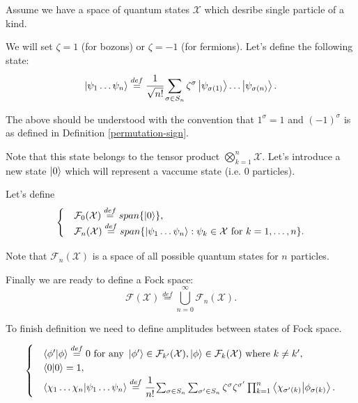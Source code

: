 \documentclass[main.tex]{subfiles}
\begin{document}
Assume we have a space of quantum states $\mathcal{X}$ which desribe single particle of a kind.

We will set $\zeta = 1$ (for bozons) or $\zeta = -1$ (for fermions). Let's define the following state:
\begin{equation}
\ket{\psi_1 \dots \psi_n} \stackrel{def}{=} \cfrac{1}{\sqrt{n!}}\sum_{\sigma\in S_n} \zeta^\sigma 
\ket{\psi_{\sigma(1)}} \dots \ket{\psi_{\sigma(n)}}. 
\end{equation}

The above should be understood with the convention that $1^\sigma = 1$ and $(-1)^\sigma$ is as defined in Definition \ref{permutation-sign}.

Note that this state belongs to the tensor product $\bigotimes_{k = 1}^n \mathcal{X}$. Let's introduce a new state $\ket{0}$ which will represent a vaccume state (i.e. 0 particles).

Let's define 
\begin{equation}
\begin{cases}
& \mathcal{F}_0(\mathcal{X}) \stackrel{def}{=} span\{{\ket{0}}\}, \\
& \mathcal{F}_n(\mathcal{X}) \stackrel{def}{=} span\{\ket{\psi_1 \dots \psi_n} : \psi_k\in \mathcal{X} \text{ for } k = 1, \dots, n\}.
\end{cases}
\end{equation}

Note that $\mathcal{F}_n (\mathcal{X})$ is a space of all possible quantum states for $n$ particles.

Finally we are ready to define a Fock space:
\begin{equation}
\mathcal{F}(\mathcal{X}) \stackrel{def}{=} \bigcup_{n=0}^\infty \mathcal{F}_n(\mathcal{X}).
\end{equation}

To finish definition we need to define amplitudes between states of Fock space.
\begin{definition}
\begin{equation}
\begin{cases}
&\bra{\phi'}\ket{\phi} \stackrel{def}{=} 0
\text{ for any }\ket{\phi'} \in\mathcal{F}_{k'} (\mathcal{X}), \ket{\phi} \in\mathcal{F}_{k} (\mathcal{X}) \text{ where } k\not=k', \\

&\bra{0}\ket{0} = 1, \\

&\bra{\chi_1\dots\chi_n} \ket{\psi_1\dots \psi_n} \stackrel{def}{=} 
\cfrac{1}{n!} \sum_{\sigma\in S_n} \sum_{\sigma'\in S_n} \zeta^\sigma \zeta^{\sigma'}
\prod_{k=1}^n \bra{\chi_{\sigma'(k)}}\ket{\phi_{\sigma(k)}}.
\end{cases}
\end{equation}
\end{definition}
\end{document}

